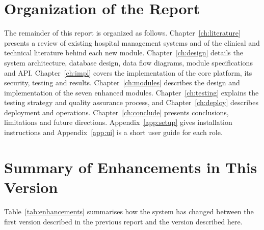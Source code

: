 \FloatBarrier
\section{Organization of the Report}

The remainder of this report is organized as follows. Chapter~\ref{ch:literature} presents a review of existing hospital management systems and of the clinical and technical literature behind each new module. Chapter~\ref{ch:design} details the system architecture, database design, data flow diagrams, module specifications and API. Chapter~\ref{ch:impl} covers the implementation of the core platform, its security, testing and results. Chapter~\ref{ch:modules} describes the design and implementation of the seven enhanced modules. Chapter~\ref{ch:testing} explains the testing strategy and quality assurance process, and Chapter~\ref{ch:deploy} describes deployment and operations. Chapter~\ref{ch:conclude} presents conclusions, limitations and future directions. Appendix~\ref{app:setup} gives installation instructions and Appendix~\ref{app:ui} is a short user guide for each role.

\FloatBarrier
\section{Summary of Enhancements in This Version}

Table~\ref{tab:enhancements} summarises how the system has changed between the first version described in the previous report and the version described here.

